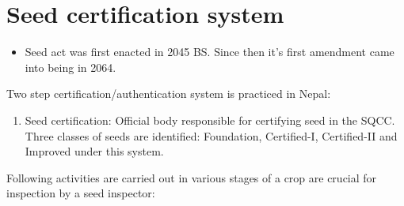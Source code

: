 \documentclass[
]{book}
\providecommand{\tightlist}{%
  \setlength{\itemsep}{0pt}\setlength{\parskip}{0pt}}
\begin{document}
\hypertarget{seed-certification-system}{%
\section{Seed certification system}\label{seed-certification-system}}

\begin{itemize}
\tightlist
\item
  Seed act was first enacted in 2045 BS. Since then it's first amendment came into being in 2064.
\end{itemize}

Two step certification/authentication system is practiced in Nepal:

\begin{enumerate}
\def\labelenumi{\arabic{enumi}.}
\tightlist
\item
  Seed certification: Official body responsible for certifying seed in the SQCC. Three classes of seeds are identified: Foundation, Certified-I, Certified-II and Improved under this system.
\end{enumerate}

Following activities are carried out in various stages of a crop are crucial for inspection by a seed inspector:
\end{document}

